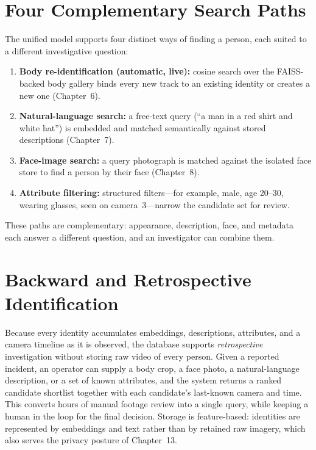 \documentclass[12pt]{report}
\begin{document}
\section{Four Complementary Search Paths}
The unified model supports four distinct ways of finding a person, each suited to a different investigative question:
\begin{enumerate}
    \item \textbf{Body re-identification (automatic, live):} cosine search over the FAISS-backed body gallery binds every new track to an existing identity or creates a new one (Chapter~6).
    \item \textbf{Natural-language search:} a free-text query (``a man in a red shirt and white hat'') is embedded and matched semantically against stored descriptions (Chapter~7).
    \item \textbf{Face-image search:} a query photograph is matched against the isolated face store to find a person by their face (Chapter~8).
    \item \textbf{Attribute filtering:} structured filters---for example, male, age 20--30, wearing glasses, seen on camera~3---narrow the candidate set for review.
\end{enumerate}
These paths are complementary: appearance, description, face, and metadata each answer a different question, and an investigator can combine them.

\section{Backward and Retrospective Identification}
Because every identity accumulates embeddings, descriptions, attributes, and a camera timeline as it is observed, the database supports \emph{retrospective} investigation without storing raw video of every person. Given a reported incident, an operator can supply a body crop, a face photo, a natural-language description, or a set of known attributes, and the system returns a ranked candidate shortlist together with each candidate's last-known camera and time. This converts hours of manual footage review into a single query, while keeping a human in the loop for the final decision. Storage is feature-based: identities are represented by embeddings and text rather than by retained raw imagery, which also serves the privacy posture of Chapter~13.
\end{document}
